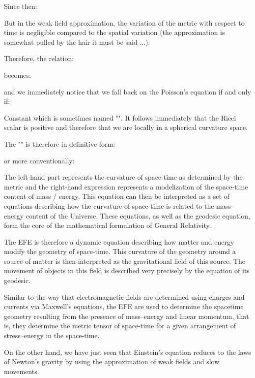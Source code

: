 	Since then:
	
	But in the weak field approximation, the variation of the metric with respect to time is negligible compared to the spatial variation (the approximation is somewhat pulled by the hair it must be said ...):
	
	Therefore, the relation:
	
	becomes:
	
	and we immediately notice that we fall back on the Poisson's equation if and only if:
	
	Constant which is sometimes named "". It follows immediately that the Ricci scalar is positive and therefore that we are locally in a spherical curvature space.

	The "" is therefore in definitive form:
	
	or more conventionally:
	
	The left-hand part represents the curvature of space-time as determined by the metric and the right-hand expression represents a modelization of the space-time content of mass / energy. This equation can then be interpreted as a set of equations describing how the curvature of space-time is related to the mass-energy content of the Universe. These equations, as well as the geodesic equation, form the core of the mathematical formulation of General Relativity.
	
	The EFE  is therefore a dynamic equation describing how matter and energy modify the geometry of space-time. This curvature of the geometry around a source of matter is then interpreted as the gravitational field of this source. The movement of objects in this field is described very precisely by the equation of its geodesic.
	
	Similar to the way that electromagnetic fields are determined using charges and currents via Maxwell's equations, the EFE are used to determine the spacetime geometry resulting from the presence of mass–energy and linear momentum, that is, they determine the metric tensor of space-time for a given arrangement of stress–energy in the space-time. 

	On the other hand, we have just seen that Einstein's equation reduces to the laws of Newton's gravity by using the approximation of weak fields and slow movements. 
	
